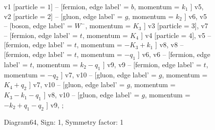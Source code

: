 \documentclass{revtex4}
\begin{document}
\begin{figure}[!htb]
\begin{center}
{    %
v1 [particle = \(1\)] -- [fermion, edge label' = \(b\), momentum = \(k_{1}\) ] v5, 
v2 [particle = \(2\)] -- [gluon, edge label' = \(g\), momentum = \(k_{2}\) ] v6, 
v5 -- [boson, edge label' = \(W^{-}\), momentum = \(K_{3}\) ] v3 [particle = \(3\)], 
v7 -- [fermion, edge label' = \(t\), momentum = \(K_{4}\) ] v4 [particle = \(4\)], 
v5 -- [fermion, edge label' = \(t\), momentum = \(-K_{3} + k_{1}\) ] v8, 
v8 -- [fermion, edge label' = \(t\), momentum = \(-q_{1}\) ] v6, 
v6 -- [fermion, edge label' = \(t\), momentum = \(k_{2} - q_{1}\) ] v9, 
v9 -- [fermion, edge label' = \(t\), momentum = \(-q_{2}\) ] v7, 
v10 -- [gluon, edge label' = \(g\), momentum = \(K_{4} + q_{2}\) ] v7, 
v10 -- [gluon, edge label' = \(g\), momentum = \(K_{3} - k_{1} - q_{1}\) ] v8, 
v10 -- [gluon, edge label' = \(g\), momentum = \(-k_{2} + q_{1} - q_{2}\) ] v9, 
};
\end{center}
\caption{Diagram64, Sign: 1, Symmetry factor: 1}
\end{figure}
\newpage
\end{document}
